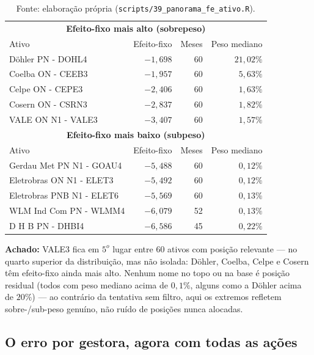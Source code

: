 \documentclass[11pt,a4paper]{article}
\newcommand{\aha}[1]{\par\vspace{4pt}\noindent\textbf{\color{vermelho}Achado:} #1\par\vspace{2pt}}
\begin{document}
\begin{table}[h]\centering\small
\caption{Os 5 ativos com efeito-fixo mais alto e mais baixo, entre os 60 com posição relevante.}
\begin{tabular}{@{}lrrr@{}}
\toprule
\multicolumn{4}{c}{\textbf{Efeito-fixo mais alto (sobrepeso)}} \\
Ativo & Efeito-fixo & Meses & Peso mediano \\
\midrule
Döhler PN - DOHL4 & $-1{,}698$ & 60 & $21{,}02\%$ \\
Coelba ON - CEEB3 & $-1{,}957$ & 60 & $5{,}63\%$ \\
Celpe ON - CEPE3 & $-2{,}406$ & 60 & $1{,}63\%$ \\
Cosern ON - CSRN3 & $-2{,}837$ & 60 & $1{,}82\%$ \\
VALE ON N1 - VALE3 & $-3{,}407$ & 60 & $1{,}57\%$ \\
\midrule
\multicolumn{4}{c}{\textbf{Efeito-fixo mais baixo (subpeso)}} \\
Ativo & Efeito-fixo & Meses & Peso mediano \\
\midrule
Gerdau Met PN N1 - GOAU4 & $-5{,}488$ & 60 & $0{,}12\%$ \\
Eletrobras ON N1 - ELET3 & $-5{,}492$ & 60 & $0{,}12\%$ \\
Eletrobras PNB N1 - ELET6 & $-5{,}569$ & 60 & $0{,}13\%$ \\
WLM Ind Com PN - WLMM4 & $-6{,}079$ & 52 & $0{,}13\%$ \\
D H B PN - DHBI4 & $-6{,}586$ & 45 & $0{,}22\%$ \\
\bottomrule
\end{tabular}
\caption*{\footnotesize Fonte: elaboração própria (\texttt{scripts/39\_panorama\_fe\_ativo.R}).}
\end{table}

\aha{VALE3 fica em $5^o$ lugar entre $60$ ativos com posição relevante --- no quarto superior da
distribuição, mas não isolada: Döhler, Coelba, Celpe e Cosern têm efeito-fixo ainda mais alto.
Nenhum nome no topo ou na base é posição residual (todos com peso mediano acima de $0{,}1\%$,
alguns como a Döhler acima de $20\%$) --- ao contrário da tentativa sem filtro, aqui os extremos
refletem sobre-/sub-peso genuíno, não ruído de posições nunca alocadas.}

\subsection{O erro por gestora, agora com todas as ações}
\label{sec:erro-multiativo}
\end{document}
